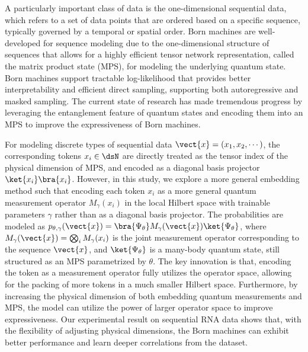 A particularly important class of data is the one-dimensional sequential data, which refers to a set of data points that are ordered based on a specific sequence, typically governed by a temporal or spatial order. Born machines are well-developed for sequence modeling due to the one-dimensional structure of sequences that allows for a highly efficient tensor network representation, called the matrix product state (MPS), for modeling the underlying quantum state\cite{orus2019tensor,2019PhRvX...9c1041L,2021arXiv210612974L}. Born machines support tractable log-likelihood that provides better interpretability and efficient direct sampling, supporting both autoregressive and masked sampling. The current state of research has made tremendous progress by leveraging the entanglement feature of quantum states and encoding them into an MPS to improve the expressiveness of Born machines\cite{2018PhRvA..98a2324D,mitarai2018quantum,2018arXiv180404168L,gong2022born,2019arXiv190300556M}.

For modeling discrete types of sequential data $\vect{x}=(x_1,x_2,\cdots)$, the corresponding tokens $x_i\in \dsN$ are directly treated as the tensor index of the physical dimension of MPS, and encoded as a diagonal basis projector $\ket{x_i}\bra{x_i}$. However, in this study, we explore a more general embedding method such that encoding each token $x_i$ as a more general quantum measurement operator $M_{\gamma}(x_i)$ in the local Hilbert space with trainable parameters $\gamma$ rather than as a diagonal basis projector. The probabilities are modeled as $p_{\theta,\gamma}(\vect{x})=\bra{\Psi_\theta}M_{\gamma}(\vect{x})\ket{\Psi_\theta}$, where $M_\gamma(\vect{x})=\bigotimes_i M_\gamma(x_i)$ is the joint measurement operator corresponding to the sequence $\vect{x}$, and $\ket{\Psi_\theta}$ is a many-body quantum state, still structured as an MPS parametrized by $\theta$. The key innovation is that, encoding the token as a measurement operator fully utilizes the operator space, allowing for the packing of more tokens in a much smaller Hilbert space. Furthermore, by increasing the physical dimension of both embedding quantum measurements and MPS, the model can utilize the power of larger operator space to improve expressiveness. Our experimental result on sequential RNA data shows that, with the flexibility of adjusting physical dimensions, the Born machines can exhibit better performance and learn deeper correlations from the dataset.

